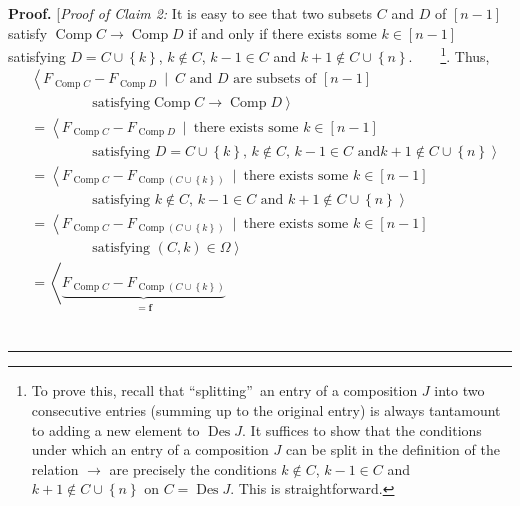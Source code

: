\documentclass[numbers=enddot,12pt,final,onecolumn,notitlepage]{scrartcl}%
\theoremstyle{definition}
\newenvironment{proof}[1][Proof]{\noindent\textbf{#1.} }{\ \rule{0.5em}{0.5em}}
\begin{document}
\begin{proof}
[\textit{Proof of Claim 2:} It is easy to see that two subsets $C$ and $D$ of
$\left[  n-1\right]  $ satisfy $\operatorname*{Comp}C\rightarrow
\operatorname*{Comp}D$ if and only if there exists some $k\in\left[
n-1\right]  $ satisfying $D=C\cup\left\{  k\right\}  $, $k\notin C$, $k-1\in
C$ and $k+1\notin C\cup\left\{  n\right\}  $.\ \ \ \ \footnote{To prove this,
recall that \textquotedblleft splitting\textquotedblright\ an entry of a
composition $J$ into two consecutive entries (summing up to the original
entry) is always tantamount to adding a new element to $\operatorname*{Des}J$.
It suffices to show that the conditions under which an entry of a composition
$J$ can be split in the definition of the relation $\rightarrow$ are precisely
the conditions $k\notin C$, $k-1\in C$ and $k+1\notin C\cup\left\{  n\right\}
$ on $C=\operatorname*{Des}J$. This is straightforward.}. Thus,%
\begin{align*}
&  \left\langle F_{\operatorname*{Comp}C}-F_{\operatorname*{Comp}D}%
\ \mid\ C\text{ and }D\text{ are subsets of }\left[  n-1\right]  \right. \\
&  \ \ \ \ \ \ \ \ \ \ \ \ \ \ \ \ \ \ \ \ \left.  \text{satisfying
}\operatorname*{Comp}C\rightarrow\operatorname*{Comp}D\right\rangle \\
&  =\left\langle F_{\operatorname*{Comp}C}-F_{\operatorname*{Comp}D}%
\ \mid\ \text{there exists some }k\in\left[  n-1\right]  \right. \\
&  \ \ \ \ \ \ \ \ \ \ \ \ \ \ \ \ \ \ \ \ \left.  \text{satisfying }%
D=C\cup\left\{  k\right\}  \text{, }k\notin C\text{, }k-1\in C\text{ and
}k+1\notin C\cup\left\{  n\right\}  \right\rangle \\
&  =\left\langle F_{\operatorname*{Comp}C}-F_{\operatorname*{Comp}\left(
C\cup\left\{  k\right\}  \right)  }\ \mid\ \text{there exists some }%
k\in\left[  n-1\right]  \right. \\
&  \ \ \ \ \ \ \ \ \ \ \ \ \ \ \ \ \ \ \ \ \left.  \text{satisfying }k\notin
C\text{, }k-1\in C\text{ and }k+1\notin C\cup\left\{  n\right\}  \right\rangle
\\
&  =\left\langle F_{\operatorname*{Comp}C}-F_{\operatorname*{Comp}\left(
C\cup\left\{  k\right\}  \right)  }\ \mid\ \text{there exists some }%
k\in\left[  n-1\right]  \right. \\
&  \ \ \ \ \ \ \ \ \ \ \ \ \ \ \ \ \ \ \ \ \left.  \text{satisfying }\left(
C,k\right)  \in\Omega\right\rangle \\
&  =\left\langle \underbrace{F_{\operatorname*{Comp}C}-F_{\operatorname*{Comp}%
\left(  C\cup\left\{  k\right\}  \right)  }}_{\substack{=\mathbf{f}%
}}
\end{align*}
\end{proof}
\end{document}
